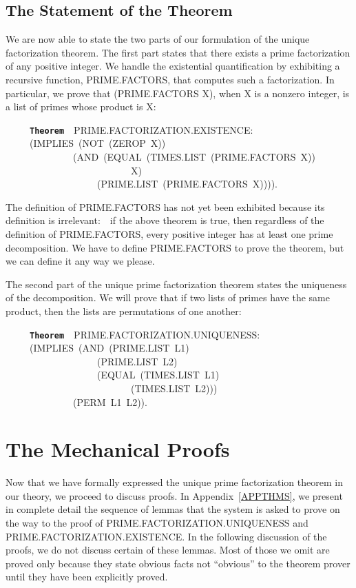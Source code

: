 \documentclass[11pt]{book}
\newenvironment{pubasis}{\begin{flushleft}\ttfamily\small}{\normalsize\rmfamily\end{flushleft}}
\newcommand{\axiomordefinition}[1]{\vspace{6pt}\texttt{\textbf{#1}}}
\newcommand{\pubdefaulttextsize}{\large}
\begin{document}
\subsection{The Statement of the Theorem}
\pubdefaulttextsize
We are now able to state the two parts of our formulation
of the unique factorization theorem.  The first part
states that there exists a prime factorization of
any positive integer.  We handle the existential quantification by
exhibiting a recursive function, PRIME.FAC\-TORS, that
computes such a factorization.  In particular, we
prove that (PRIME.FAC\-TORS X), when X is a nonzero integer, is a
list of primes whose product is X:
\begin{pubasis}
~~~~~\axiomordefinition{Theorem}~~PRIME.FAC\-TOR\-I\-ZA\-TION.EXISTENCE:\\
~~~~~(IMPLIES~(NOT~(ZEROP~X))\\
~~~~~~~~~~~~~~(AND~(EQUAL~(TIMES.LIST~(PRIME.FAC\-TORS~X))\\
~~~~~~~~~~~~~~~~~~~~~~~~~~X)\\
~~~~~~~~~~~~~~~~~~~(PRIME.LIST~(PRIME.FAC\-TORS~X)))).\\
\end{pubasis}
The definition of PRIME.FAC\-TORS has not yet been exhibited
because its definition is irrelevant:~~if the above theorem is
true, then regardless of the definition of PRIME.FAC\-TORS, 
every positive integer has at least one prime decomposition.
We  have to define PRIME.FAC\-TORS to prove the theorem, but we
can define it any way we please.

The second part of the unique prime factorization theorem states the
uniqueness of the decomposition.  We will prove that
if two lists of primes have the same product, then the lists
are permutations of one another:
\begin{pubasis}
~~~~~\axiomordefinition{Theorem}~~PRIME.FAC\-TOR\-I\-ZA\-TION.UNIQUENESS:\\
~~~~~(IMPLIES~(AND~(PRIME.LIST~L1)\\
~~~~~~~~~~~~~~~~~~~(PRIME.LIST~L2)\\
~~~~~~~~~~~~~~~~~~~(EQUAL~(TIMES.LIST~L1)\\
~~~~~~~~~~~~~~~~~~~~~~~~~~(TIMES.LIST~L2)))\\
~~~~~~~~~~~~~~(PERM~L1~L2)).\\
\end{pubasis}
\section{The Mechanical Proofs}
\label{MECHPROOFS}
\pubdefaulttextsize
Now that we have formally expressed the
unique prime factorization theorem in our theory,
we proceed to discuss proofs.  In Appendix~\ref{APPTHMS}, we
present in complete detail the sequence of lemmas
that the system is asked to prove on the way
to the proof of PRIME.FAC\-TOR\-I\-ZA\-TION.UNIQUENESS and
PRIME.FAC\-TOR\-I\-ZA\-TION.EXISTENCE.  In the following discussion
of the proofs, we do not discuss certain
of these lemmas.  Most of those we omit are proved
only because they state obvious facts not
``obvious'' to the theorem prover until they
have been explicitly proved.
\end{document}
